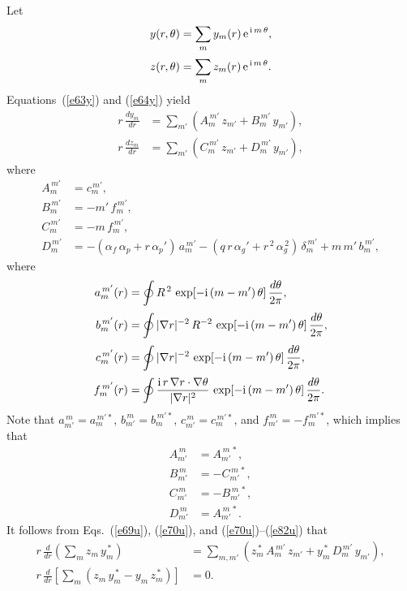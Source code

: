 \documentclass[12pt,prb,aps,notitlepage]{revtex4-1}
\begin{document}
Let
\begin{align}
y(r,\theta)&= \sum_m y_m(r)\,{\rm e}^{\,{\rm i}\,m\,\theta},\\[0.5ex]
z(r,\theta) &= \sum_m z_m(r)\,{\rm e}^{\,{\rm i}\,m\,\theta}.
\end{align}
Equations~(\ref{e63y}) and (\ref{e64y}) yield
\begin{align}\label{e69u}
r\,\frac{dy_m}{dr}&= \sum_{m'}\left(A_{m}^{\,m'}\,z_{m'} + B_{m}^{\,m'}\,y_{m'}\right),\\[0.5ex]
r\,\frac{dz_m}{dr}&= \sum_{m'}\left(C_{m}^{\,m'}\,z_{m'} + D_{m}^{\,m'}\,y_{m'}\right),\label{e70u}
\end{align}
where
\begin{align}
A_m^{\,m'} &= c_{m}^{\,m'},\\[0.5ex]
B_m^{\,m'} &= - m'\,f_m^{\,m'},\\[0.5ex]
C_{m}^{\,m'} &= -m\,f_m^{\,m'},\\[0.5ex]
D_{m}^{\,m'}&= -(\alpha_f\,\alpha_p+ r\,\alpha_p')\,a_m^{\,m'} - (q\,r\,\alpha_g' +r^{\,2}\,\alpha_g^{\,2})\,\delta_m^{\,m'}+m\,m'\,b_m^{\,m'},
\end{align}
where
\begin{align}
a_m^{\,m'}(r)  &=\oint R^{\,2}\,\exp[-{\rm i}\,(m-m')\,\theta]\,\frac{d\theta}{2\pi},\\[0.5ex]
b_m^{\,m'}(r)  &=\oint|\nabla r|^{-2}\, R^{-2}\,\exp[-{\rm i}\,(m-m')\,\theta]\,\frac{d\theta}{2\pi},\\[0.5ex]
c_m^{\,m'}(r)  &=\oint|\nabla r|^{-2}\,\exp[-{\rm i}\,(m-m')\,\theta]\,\frac{d\theta}{2\pi},\\[0.5ex]
f_{m}^{\,m'}(r)&= \oint \frac{{\rm i}\,r\,\nabla r\cdot\nabla\theta}{|\nabla r|^2}\,\exp[-{\rm i}\,(m-m')\,\theta]\,\frac{d\theta}{2\pi}.
\end{align}
Note that
$a_{m'}^{\,m} =a_{m}^{\,m'\ast}$, 
$b_{m'}^{\,m} =b_{m}^{\,m'\ast}$, 
$c_{m'}^{\,m} =c_{m}^{\,m'\ast}$, and 
$f_{m'}^{\,m} =-f_{m}^{\,m'\ast}$,
which implies that
\begin{align}\label{e70u}
A_{m'}^{\,m} &= A_{m'}^{\,m\,\ast},\\[0.5ex]
B_{m'}^{\,m} &= -C_{m'}^{\,m\,\ast},\\[0.5ex]
C_{m'}^{\,m} &= -B_{m'}^{\,m\,\ast},\\[0.5ex]
D_{m'}^{\,m} &= A_{m'}^{\,m\,\ast}.\label{e82u}
\end{align}
It follows from Eqs.~(\ref{e69u}), (\ref{e70u}), and (\ref{e70u})--(\ref{e82u}) that 
\begin{align}
r\,\frac{d}{dr}\!\left(\sum_m z_m\,y_m^{\,\ast} \right)&= \sum_{m,m'}\left(z_m^{\,\ast}\,A_{m}^{\,m'}\,z_{m'} + y_m^{\,\ast}\,D_{m}^{\,m'}\,y_{m'}\right),\\[0.5ex]
r\,\frac{d}{dr}\!\left[\sum_m (z_m\,y_m^{\,\ast}- y_m\,z_m^{\,\ast}) \right]&= 0.
\end{align}
\end{document}
